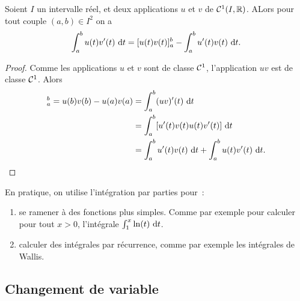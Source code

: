 \begin{theo}
  Soient \(I\) un intervalle réel, et deux applications \(u\) et \(v\) de 
  \(\mathcal{C}^{1}(I,\mathbb{R})\). ALors pour tout couple \((a,b) \in I^2\) on a
  \begin{equation}
    \int_a^b u(t)v'(t)\,\mathop{}\mathopen{}\mathrm{d} t = [u(t)v(t)]_a^b - \int_a^b u'(t)v(t)\,\mathop{}\mathopen{}\mathrm{d} t.
  \end{equation}
\end{theo}
\begin{proof}
  Comme les applications \(u\) et \(v\) sont de classe \(\mathcal{C}^{1}\), 
  l'application \(uv\) est de classe \(\mathcal{C}^{1}\). Alors
  \begin{align*}
    [u(t)v(t)]_a^b = u(b)v(b)-u(a)v(a) & = \int_a^b (uv)'(t)\,\diff t \\
    & = \int_a^b[u'(t)v(t)u(t)v'(t)]\,\diff t \\
    & = \int_a^b u'(t)v(t)\,\diff t + \int_a^b u(t)v'(t)\,\diff t.
  \end{align*}
\end{proof}

En pratique, on utilise l'intégration par parties pour~:
\begin{enumerate}
  \item se ramener à des fonctions plus simples. Comme par exemple pour calculer 
    pour tout \(x>0\), l'intégrale \(\int_1^x \ln(t)\,\mathop{}\mathopen{}\mathrm{d} t\).
  \item calculer des intégrales par récurrence, comme par exemple les intégrales 
    de Wallis.
\end{enumerate}

\subsection{Changement de variable}

